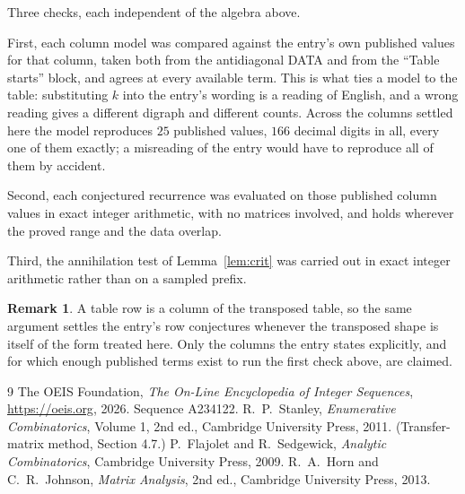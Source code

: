 \documentclass[11pt,a4paper]{article}
\theoremstyle{plain}
\theoremstyle{definition}
\newtheorem{remark}[theorem]{Remark}
\begin{document}
Three checks, each independent of the algebra above.

First, each column model was compared against the entry's own published values for that
column, taken both from the antidiagonal DATA and from the ``Table starts'' block, and agrees
at every available term. This is what ties a model to the table: substituting $k$ into the
entry's wording is a reading of English, and a wrong reading gives a different digraph and
different counts. Across the columns settled here the model reproduces $25$ published
values, $166$ decimal digits in all, every one of them exactly; a misreading of the entry
would have to reproduce all of them by accident.

Second, each conjectured recurrence was evaluated on those published column values in exact
integer arithmetic, with no matrices involved, and holds wherever the proved range and the
data overlap.

Third, the annihilation test of Lemma~\ref{lem:crit} was carried out in exact integer
arithmetic rather than on a sampled prefix.

\begin{remark}
A table row is a column of the transposed table, so the same argument settles the entry's row
conjectures whenever the transposed shape is itself of the form treated here. Only the columns
the entry states explicitly, and for which enough published terms exist to run the first check
above, are claimed.
\end{remark}

\begin{thebibliography}{9}
 The OEIS Foundation, \emph{The On-Line Encyclopedia of Integer
Sequences}, \url{https://oeis.org}, 2026. Sequence A234122.
 R.~P.~Stanley, \emph{Enumerative Combinatorics}, Volume 1, 2nd ed.,
Cambridge University Press, 2011. (Transfer-matrix method, Section 4.7.)
 P.~Flajolet and R.~Sedgewick, \emph{Analytic Combinatorics}, Cambridge
University Press, 2009.
 R.~A.~Horn and C.~R.~Johnson, \emph{Matrix Analysis}, 2nd ed., Cambridge
University Press, 2013.
\end{thebibliography}
\end{document}
